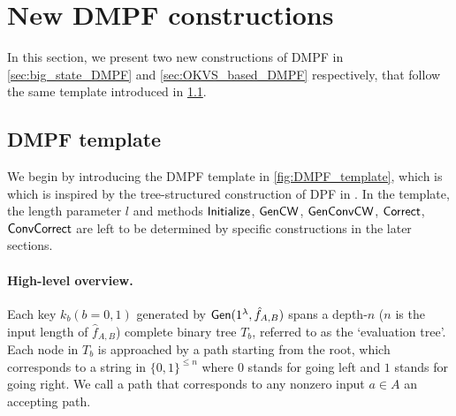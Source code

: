 \section{New DMPF constructions}
In this section, we present two new constructions of DMPF in \cref{sec:big_state_DMPF} and \cref{sec:OKVS_based_DMPF} respectively,  that follow the same template introduced in \cref{sec:DMPF_template}. 

\subsection{DMPF template}\label{sec:DMPF_template}
We begin by introducing the DMPF template in \cref{fig:DMPF_template}, which is which is inspired by the tree-structured construction of DPF in \cite{BoyGilIsh16}. In the template, the length parameter $l$ and methods $\sf Initialize$, $\sf GenCW$, $\sf GenConvCW$, $\sf Correct$, $\sf ConvCorrect$ are left to be determined by specific constructions in the later sections. 




\paragraph{High-level overview. }Each key $k_b(b=0,1)$ generated by ${\sf Gen}(1^\lambda,\hat{f}_{A,B})$ spans a depth-$n$ ($n$ is the input length of $\hat{f}_{A,B}$) complete binary tree $T_b$, referred to as the `evaluation tree'. Each node in $T_b$ is approached by a path starting from the root, which corresponds to a string in $\{0,1\}^{\le n}$ where $0$ stands for going left and $1$ stands for going right. We call a path that corresponds to any nonzero input $a\in A$ an accepting path. 

